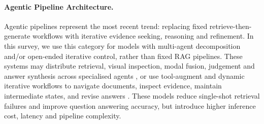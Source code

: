 \documentclass[11pt]{article}
\begin{document}

\paragraph{Agentic Pipeline Architecture.}
Agentic pipelines represent the most recent trend: replacing fixed retrieve-then-generate workflows with iterative evidence seeking, reasoning and refinement. In this survey, we use this category for models with multi-agent decomposition and/or open-ended iterative control, rather than fixed RAG pipelines. These systems may distribute retrieval, visual inspection, modal fusion, judgement and answer synthesis across specialised agents \cite{han2025mdocagent, duan2025m2rag, yu2025visual}, or use tool-augment and dynamic iterative workflows to navigate documents, inspect evidence, maintain intermediate states, and revise answers \cite{sun2025docagent, zhu2025doclens, zheng2026doc, wang2025vidorag}. These models reduce single-shot retrieval failures and improve question answering accuracy, but introduce higher inference cost, latency and pipeline complexity.
\end{document}
